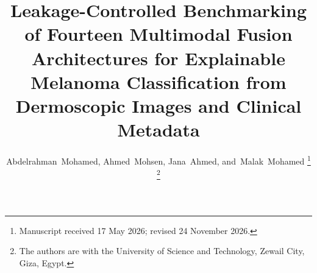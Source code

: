 \documentclass[journal]{IEEEtran}
\begin{document}
\title{Leakage-Controlled Benchmarking of Fourteen Multimodal Fusion Architectures for Explainable Melanoma Classification from Dermoscopic Images and Clinical Metadata}

\author{Abdelrahman~Mohamed, Ahmed~Mohsen, Jana~Ahmed, and~Malak~Mohamed
\thanks{Manuscript received 17 May 2026; revised 24 November 2026.}
\thanks{The authors are with the University of Science and Technology, Zewail City, Giza, Egypt.}}


\maketitle
\end{document}
